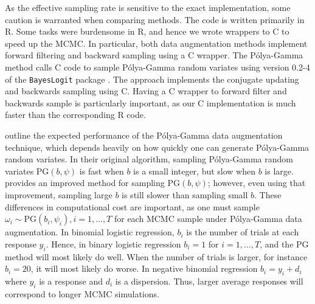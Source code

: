 \documentclass[11pt]{article}
\newcommand{\Polya}{P\'{o}lya}
\newcommand{\PG}{\text{PG}}
\begin{document}
As the effective sampling rate is sensitive to the exact implementation, some
caution is warranted when comparing methods. The code is written primarily in R.
Some tasks were burdensome in R, and hence we wrote wrappers to C to speed up
the MCMC.  In particular, both data augmentation methods implement forward
filtering and backward sampling using a C wrapper.  The \Polya-Gamma method
calls C code to sample \Polya-Gamma random variates using version 0.2-4 of the
\texttt{BayesLogit} package \citep{bayeslogit-2013}.  The
\cite{ravines-etal-2006} approach implements the conjugate updating and
backwards sampling using C.  Having a C wrapper to forward filter and backwards
sample is particularly important, as our C implementation is much faster than
the corresponding R code.

\cite{polson-etal-2013} outline the expected performance of the \Polya-Gamma
data augmentation technique, which depends heavily on how quickly one can
generate \Polya-Gamma random variates.  In their original algorithm, sampling
\Polya-Gamma random variates $\PG(b,\psi)$ is fast when $b$ is a small integer,
but slow when $b$ is large. \cite{windle-thesis-2013} provides an improved
method for sampling $\PG(b,\psi)$; however, even using that improvement,
sampling large $b$ is still slower than sampling small $b$.  These differences
in computational cost are important, as one must sample $\omega_i \sim \PG(b_i,
\psi_i), i=1,\ldots,T$ for each MCMC sample under \Polya-Gamma data
augmentation.  In binomial logistic regression, $b_i$ is the number of trials at
each response $y_i$.  Hence, in binary logistic regression $b_i = 1$ for $i=1,
\ldots, T$, and the PG method will most likely do well.  When the number of
trials is larger, for instance $b_i = 20$, it will most likely do worse.  In
negative binomial regression $b_i = y_i + d_i$ where $y_i$ is a response and
$d_i$ is a dispersion.  Thus, larger average responses will correspond to longer
MCMC simulations.
\end{document}
